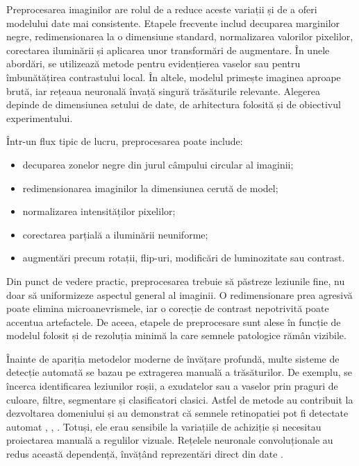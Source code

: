 \documentclass[12pt, a4paper, oneside, romanian]{teza-upb}
\begin{document}
\bigskip

Preprocesarea imaginilor are rolul de a reduce aceste variații și de a oferi modelului date mai consistente. Etapele frecvente includ decuparea marginilor negre, redimensionarea la o dimensiune standard, normalizarea valorilor pixelilor, corectarea iluminării și aplicarea unor transformări de augmentare. În unele abordări, se utilizează metode pentru evidențierea vaselor sau pentru îmbunătățirea contrastului local. În altele, modelul primește imaginea aproape brută, iar rețeaua neuronală învață singură trăsăturile relevante. Alegerea depinde de dimensiunea setului de date, de arhitectura folosită și de obiectivul experimentului.
\bigskip

Într-un flux tipic de lucru, preprocesarea poate include:

\begin{itemize}
  \item decuparea zonelor negre din jurul câmpului circular al imaginii;
  \item redimensionarea imaginilor la dimensiunea cerută de model;
  \item normalizarea intensităților pixelilor;
  \item corectarea parțială a iluminării neuniforme;
  \item augmentări precum rotații, flip-uri, modificări de luminozitate sau contrast.
\end{itemize}

\bigskip

Din punct de vedere practic, preprocesarea trebuie să păstreze leziunile fine, nu doar să uniformizeze aspectul general al imaginii. O redimensionare prea agresivă poate elimina microanevrismele, iar o corecție de contrast nepotrivită poate accentua artefactele. De aceea, etapele de preprocesare sunt alese în funcție de modelul folosit și de rezoluția minimă la care semnele patologice rămân vizibile.
\bigskip

Înainte de apariția metodelor moderne de învățare profundă, multe sisteme de detecție automată se bazau pe extragerea manuală a trăsăturilor. De exemplu, se încerca identificarea leziunilor roșii, a exudatelor sau a vaselor prin praguri de culoare, filtre, segmentare și clasificatori clasici. Astfel de metode au contribuit la dezvoltarea domeniului și au demonstrat că semnele retinopatiei pot fi detectate automat \cite{1_niemeijer2005automatic}, \cite{2_sopharak2009automatic}, \cite{13_staal2004ridge}. Totuși, ele erau sensibile la variațiile de achiziție și necesitau proiectarea manuală a regulilor vizuale. Rețelele neuronale convoluționale au redus această dependență, învățând reprezentări direct din date \cite{4_pratt2016convolutional}.
\bigskip
\end{document}
